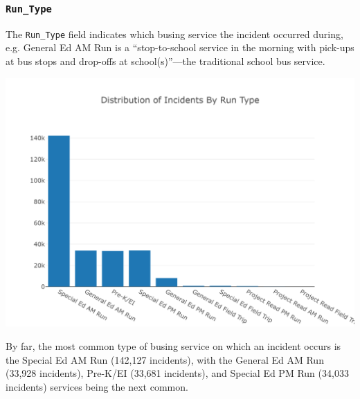 \documentclass[11pt]{article}
\begin{document}
\subsubsection{\texttt{Run\_Type}}
The \texttt{Run\_Type} field indicates which busing service the incident occurred during, e.g. General Ed AM Run is a ``stop-to-school service in the morning with pick-ups at bus stops and drop-offs at school(s)''---the traditional school bus service.
\begin{center}
\includegraphics[width=5.25in]{images/run_type.png}
\end{center}
By far, the most common type of busing service on which an incident occurs is the Special Ed AM Run (142,127 incidents), with the General Ed AM Run (33,928 incidents), Pre-K/EI (33,681 incidents), and Special Ed PM Run (34,033 incidents) services being the next common.
\end{document}
